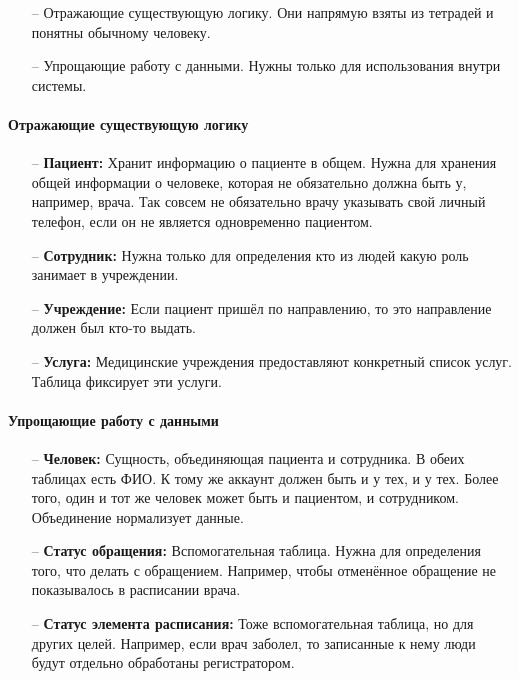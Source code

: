 \documentclass[a4paper,article]{article}
\begin{document}
    \begin{itemize}[nolistsep]
        \item[--] Отражающие существующую логику. Они напрямую взяты из тетрадей и понятны обычному человеку.
        \item[--] Упрощающие работу с данными. Нужны только для использования внутри системы.
    \end{itemize}

    \paragraph{Отражающие существующую логику}\label{Проектирование БД. Вспомогательные компоненты. Отражающие логику}

    \begin{itemize}[nolistsep]
        \item[--] \textbf{Пациент:} Хранит информацию о пациенте в общем. Нужна для хранения общей информации о человеке, которая не обязательно должна быть у, например, врача. Так совсем не обязательно врачу указывать свой личный телефон, если он не является одновременно пациентом.
        \item[--] \textbf{Сотрудник:} Нужна только для определения кто из людей какую роль занимает в учреждении.
        \item[--] \textbf{Учреждение:} Если пациент пришёл по направлению, то это направление должен был кто-то выдать.
        \item[--] \textbf{Услуга:} Медицинские учреждения предоставляют конкретный список услуг. Таблица фиксирует эти услуги.
    \end{itemize}

    \paragraph{Упрощающие работу с данными}\label{Проектирование БД. Вспомогательные компоненты. Упрощающие работу с данными}

    \begin{itemize}[nolistsep]
        \item[--] \textbf{Человек:} Сущность, объединяющая пациента и сотрудника. В обеих таблицах есть ФИО. К тому же аккаунт должен быть и у тех, и у тех. Более того, один и тот же человек может быть и пациентом, и сотрудником. Объединение нормализует данные.
        \item[--] \textbf{Статус обращения:} Вспомогательная таблица. Нужна для определения того, что делать с обращением. Например, чтобы отменённое обращение не показывалось в расписании врача.
        \item[--] \textbf{Статус элемента расписания:} Тоже вспомогательная таблица, но для других целей. Например, если врач заболел, то записанные к нему люди будут отдельно обработаны регистратором.
    \end{itemize}
\end{document}
